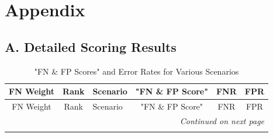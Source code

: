 \documentclass{article}
\begin{document}
\newpage
\section*{Appendix}
\subsection*{A. Detailed Scoring Results}



\begin{longtable}{c c p{4cm} c c c}
\caption{"FN \& FP Scores" and Error Rates for Various Scenarios} \label{tab:fn_fp_scores} \\
\toprule
FN Weight & Rank & Scenario & "FN \& FP Score" & FNR & FPR \\
\midrule
\endfirsthead

\toprule
FN Weight & Rank & Scenario & "FN \& FP Score" & FNR & FPR \\
\midrule
\endhead

\midrule
\multicolumn{6}{r}{\textit{{Continued on next page}}} \\
\endfoot

\bottomrule
\endlastfoot


\end{longtable}
\end{document}
